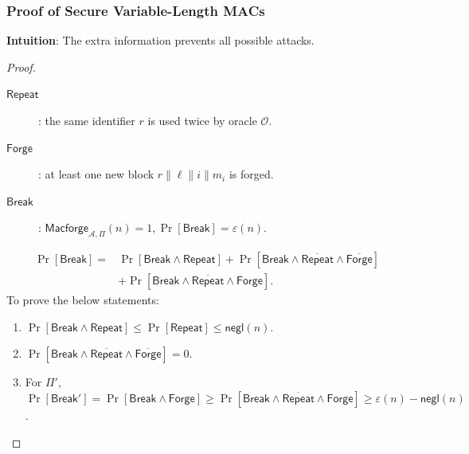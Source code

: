 \begin{frame}\frametitle{Proof of Secure Variable-Length MACs}
\textbf{Intuition}: The extra information prevents all possible attacks.
\begin{proof}
\begin{description}
\item[$\mathsf{Repeat}$]: the same identifier $r$ is used twice by oracle $\mathcal{O}$. 
\item[$\mathsf{Forge}$]: at least one new block $r\| \ell\| i\| m_i$ is forged. 
\item[$\mathsf{Break}$]: $\mathsf{Macforge}_{\mathcal{A},\Pi }(n)=1, \Pr[\mathsf{Break}]=\varepsilon(n)$. 
\end{description}
\[
\begin{split}
	\Pr[\mathsf{Break}] =& \Pr[\mathsf{Break} \land \mathsf{Repeat}] + \Pr[\mathsf{Break} \land \overline{\mathsf{Repeat}} \land \overline{\mathsf{Forge}}] \\
	&+ \Pr[\mathsf{Break} \land \overline{\mathsf{Repeat}} \land \mathsf{Forge}].
\end{split}
\]
To prove the below statements:
\begin{enumerate}
\item $\Pr[\mathsf{Break} \land \mathsf{Repeat}] \le \Pr[\mathsf{Repeat}] \le \mathsf{negl}(n)$.
\item $\Pr[\mathsf{Break} \land \overline{\mathsf{Repeat}} \land \overline{\mathsf{Forge}}] = 0$.
\item For $\Pi'$, $\Pr[\mathsf{Break}'] = \Pr[\mathsf{Break} \land \mathsf{Forge}] \ge \Pr[\mathsf{Break} \land \overline{\mathsf{Repeat}} \land \mathsf{Forge}] \ge \varepsilon(n) - \mathsf{negl}(n)$.
\end{enumerate}
\end{proof}
\end{frame}
